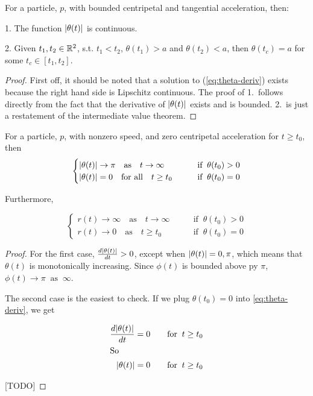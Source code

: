 \begin{lemma}
  For a particle, $p$, with bounded centripetal and tangential acceleration, then: 

  1. The function $\abs{\theta(t)}$ is continuous. 

  2. Given $t_1, t_2 \in \mathbb R^2$, s.t. $t_1 < t_2$, $\theta(t_1) > a$ and $\theta(t_2) < a$, then $\theta(t_c) = a$ for some $t_c \in [t_1, t_2]$.
\end{lemma}

\begin{proof}
First off, it should be noted that a solution to (\ref{eq:theta-deriv}) exists because the right hand side is Lipschitz continuous. The proof of 1.\ follows directly from the fact that the derivative of $\abs{\theta(t)}$ exists and is bounded. 2.\ is just a restatement of the intermediate value theorem.
\end{proof}

\begin{lemma}\label{lemma:polar-assymptote}
  For a particle, $p$, with nonzero speed, and zero centripetal acceleration for $t \ge t_0$, then
  \[
    \begin{cases}
      \abs{\theta(t)} \to \pi \quad \text{as} \quad t \to \infty \qquad &\text{if} \;\; \theta(t_0) > 0\\
      \abs{\theta(t)} = 0 \quad \text{for all} \quad t \ge t_0 \qquad &\text{if} \;\; \theta(t_0) = 0
    \end{cases}
  \]

    Furthermore,

  \[
    \begin{cases}
      r(t) \to \infty \quad \text{as} \quad t \to \infty \qquad &\text{if} \;\; \theta(t_0) > 0\\
      r(t) \to 0 \quad \text{as} \quad t \ge t_0 \qquad &\text{if} \;\; \theta(t_0) = 0
    \end{cases}
  \]
\end{lemma}

\begin{proof}

For the first case, $\frac{d\abs{\theta(t)}}{dt} > 0$, except when $\abs{\theta(t)} = 0, \pi$, which means that $\theta(t)$ is monotonically increasing. Since $\phi(t)$ is bounded above py $\pi$, $\phi(t) \to \pi \;\; \text{as} \;\; \infty$.

The second case is the easiest to check. If we plug $\theta(t_0) = 0$ into \ref{eq:theta-deriv}, we get

\begin{align*}
\frac{d\abs{\theta(t)}}{dt} = 0 \qquad \text{for} \;\; t \ge t_0\\
\intertext{So}
\abs{\theta(t)} = 0 \qquad \text{for} \;\; t \ge t_0
\end{align*}

[TODO]

\end{proof}
